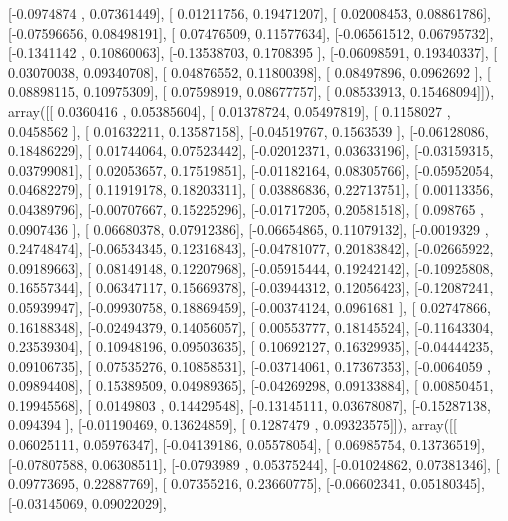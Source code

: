 \documentclass{article}
\begin{document}
       [-0.0974874 ,  0.07361449],
       [ 0.01211756,  0.19471207],
       [ 0.02008453,  0.08861786],
       [-0.07596656,  0.08498191],
       [ 0.07476509,  0.11577634],
       [-0.06561512,  0.06795732],
       [-0.1341142 ,  0.10860063],
       [-0.13538703,  0.1708395 ],
       [-0.06098591,  0.19340337],
       [ 0.03070038,  0.09340708],
       [ 0.04876552,  0.11800398],
       [ 0.08497896,  0.0962692 ],
       [ 0.08898115,  0.10975309],
       [ 0.07598919,  0.08677757],
       [ 0.08533913,  0.15468094]]), array([[ 0.0360416 ,  0.05385604],
       [ 0.01378724,  0.05497819],
       [ 0.1158027 ,  0.0458562 ],
       [ 0.01632211,  0.13587158],
       [-0.04519767,  0.1563539 ],
       [-0.06128086,  0.18486229],
       [ 0.01744064,  0.07523442],
       [-0.02012371,  0.03633196],
       [-0.03159315,  0.03799081],
       [ 0.02053657,  0.17519851],
       [-0.01182164,  0.08305766],
       [-0.05952054,  0.04682279],
       [ 0.11919178,  0.18203311],
       [ 0.03886836,  0.22713751],
       [ 0.00113356,  0.04389796],
       [-0.00707667,  0.15225296],
       [-0.01717205,  0.20581518],
       [ 0.098765  ,  0.0907436 ],
       [ 0.06680378,  0.07912386],
       [-0.06654865,  0.11079132],
       [-0.0019329 ,  0.24748474],
       [-0.06534345,  0.12316843],
       [-0.04781077,  0.20183842],
       [-0.02665922,  0.09189663],
       [ 0.08149148,  0.12207968],
       [-0.05915444,  0.19242142],
       [-0.10925808,  0.16557344],
       [ 0.06347117,  0.15669378],
       [-0.03944312,  0.12056423],
       [-0.12087241,  0.05939947],
       [-0.09930758,  0.18869459],
       [-0.00374124,  0.0961681 ],
       [ 0.02747866,  0.16188348],
       [-0.02494379,  0.14056057],
       [ 0.00553777,  0.18145524],
       [-0.11643304,  0.23539304],
       [ 0.10948196,  0.09503635],
       [ 0.10692127,  0.16329935],
       [-0.04444235,  0.09106735],
       [ 0.07535276,  0.10858531],
       [-0.03714061,  0.17367353],
       [-0.0064059 ,  0.09894408],
       [ 0.15389509,  0.04989365],
       [-0.04269298,  0.09133884],
       [ 0.00850451,  0.19945568],
       [ 0.0149803 ,  0.14429548],
       [-0.13145111,  0.03678087],
       [-0.15287138,  0.094394  ],
       [-0.01190469,  0.13624859],
       [ 0.1287479 ,  0.09323575]]), array([[ 0.06025111,  0.05976347],
       [-0.04139186,  0.05578054],
       [ 0.06985754,  0.13736519],
       [-0.07807588,  0.06308511],
       [-0.0793989 ,  0.05375244],
       [-0.01024862,  0.07381346],
       [ 0.09773695,  0.22887769],
       [ 0.07355216,  0.23660775],
       [-0.06602341,  0.05180345],
       [-0.03145069,  0.09022029],
\end{document}
